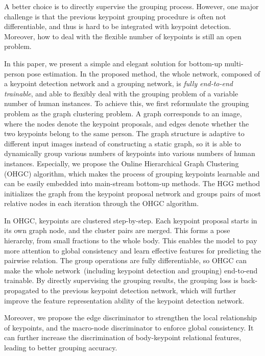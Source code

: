 \documentclass[runningheads]{llncs}
\begin{document}
	A better choice is to directly supervise the grouping process. 
	However, one major challenge is that the previous keypoint grouping procedure is often not differentiable, and thus is hard to be integrated with keypoint detection. Moreover, how to deal with the flexible number of keypoints is still an open problem.
	
	In this paper, we present a simple and elegant solution for bottom-up multi-person pose estimation. In the proposed method, 
	the whole network, composed of a keypoint detection network and a grouping network, is \emph{fully end-to-end trainable},
	and able to	flexibly deal with the grouping problem of a variable number of human instances.
	To achieve this, we first reformulate the grouping problem as the graph clustering problem. 
	A graph corresponds to an image, where the nodes denote the keypoint proposals, and edges denote whether the two keypoints belong to the same person. The graph structure is adaptive to different input images instead of constructing a static graph, so it is able to dynamically group various numbers of keypoints into various numbers of human instances. Especially, we propose the Online Hierarchical Graph Clustering (OHGC) algorithm,
	which makes the process of grouping keypoints learnable and can be easily embedded into main-stream bottom-up methods. The HGG method initializes the graph from the keypoint proposal network and groups pairs of most relative nodes in each iteration through the OHGC algorithm.
	
	In OHGC, keypoints are clustered step-by-step.
	Each keypoint proposal starts in its own graph node, and the cluster pairs are merged. This forms a pose hierarchy, from small fractions to the whole body. This enables the model to pay more attention to global consistency and learn effective features for predicting the pairwise relation.
	The group operations are fully differentiable, so OHGC can make the whole network~(including keypoint detection and grouping) end-to-end trainable. By directly supervising the grouping results, the grouping loss is back-propagated to the previous keypoint detection network, which will further improve the feature representation ability of the keypoint detection network. 
	
	Moreover, we propose the edge discriminator to strengthen the local relationship of keypoints, and the macro-node discriminator to enforce global consistency. It can further increase the discrimination of body-keypoint relational features, leading to better grouping accuracy.
	
\end{document}
